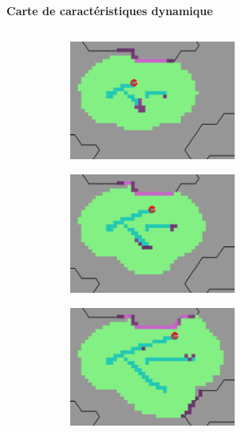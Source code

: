 \documentclass[aspectratio=169,10pt]{beamer}
\begin{document}
\begin{frame}{\textbf{Carte de caractéristiques dynamique}}
\begin{columns}
\begin{column}{0.7\textwidth}
			\begin{figure}[H]
				\centering
				\begin{subfigure}{0.32\textwidth}
					\centering
					\includegraphics[width=0.6\textwidth]{IMAGES/lgm_t1_c.png}
				\end{subfigure}
				\hfill
				\begin{subfigure}{0.32\textwidth}
					\centering
					\includegraphics[width=0.6\textwidth]{IMAGES/lgm_t2_c.png}
				\end{subfigure}
				\hfill
				\begin{subfigure}{0.32\textwidth}
					\centering
					\includegraphics[width=0.6\textwidth]{IMAGES/lgm_t3_c.png}
				\end{subfigure}
			\end{figure}
			


\end{column}
\end{columns}
\end{frame}
\end{document}
